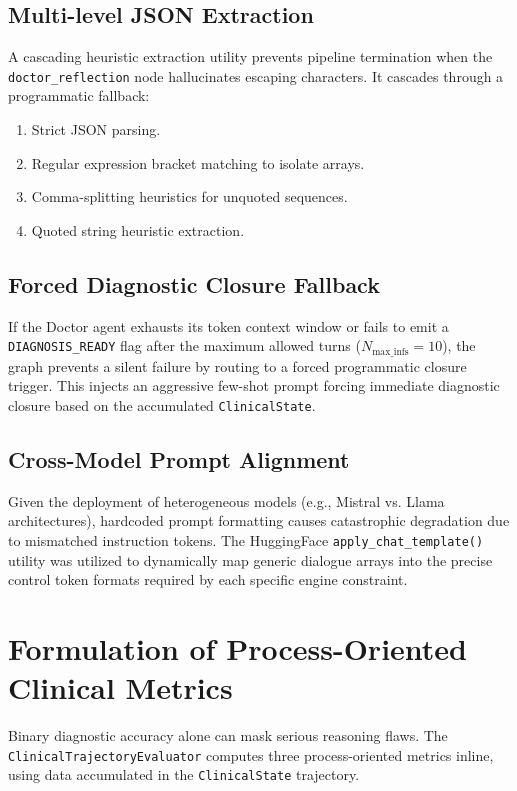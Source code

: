 \subsection{Multi-level JSON Extraction}
A cascading heuristic extraction utility prevents pipeline termination when the \texttt{doctor\_reflection} node hallucinates escaping characters. It cascades through a programmatic fallback:
\begin{enumerate}
    \item Strict JSON parsing.
    \item Regular expression bracket matching to isolate arrays.
    \item Comma-splitting heuristics for unquoted sequences.
    \item Quoted string heuristic extraction.
\end{enumerate}

\subsection{Forced Diagnostic Closure Fallback}
If the Doctor agent exhausts its token context window or fails to emit a \texttt{DIAGNOSIS\_READY} flag after the maximum allowed turns ($N_{\text{max\_infs}} = 10$), the graph prevents a silent failure by routing to a forced programmatic closure trigger. This injects an aggressive few-shot prompt forcing immediate diagnostic closure based on the accumulated \texttt{ClinicalState}.

\subsection{Cross-Model Prompt Alignment}
Given the deployment of heterogeneous models (e.g., Mistral vs. Llama architectures), hardcoded prompt formatting causes catastrophic degradation due to mismatched instruction tokens. The HuggingFace \texttt{apply\_chat\_template()} utility was utilized to dynamically map generic dialogue arrays into the precise control token formats required by each specific engine constraint.

\section{Formulation of Process-Oriented Clinical Metrics}

Binary diagnostic accuracy alone can mask serious reasoning flaws. The \texttt{ClinicalTrajectoryEvaluator} computes three process-oriented metrics inline, using data accumulated in the \texttt{ClinicalState} trajectory.

